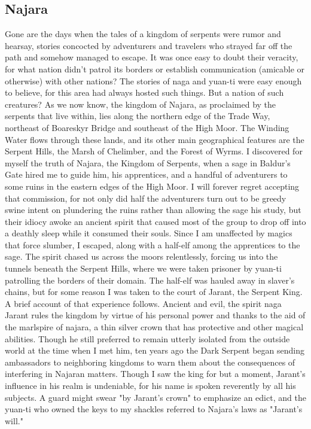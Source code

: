 \documentclass[10pt,a4paper,twoside,twocolumn,openany,bg=print,nodeprecatedcode]{dndbook}
\begin{document}
\subsection{Najara}
Gone are the days when the tales of a kingdom of serpents were rumor and hearsay, stories concocted by adventurers and travelers who strayed far off the path and somehow managed to escape. It was once easy to doubt their veracity, for what nation didn't patrol its borders or establish communication (amicable or otherwise) with other nations? The stories of naga and yuan-ti were easy enough to believe, for this area had always hosted such things. But a nation of such creatures?
As we now know, the kingdom of Najara, as proclaimed by the serpents that live within, lies along the northern edge of the Trade Way, northeast of Boareskyr Bridge and southeast of the High Moor. The Winding Water flows through these lands, and its other main geographical features are the Serpent Hills, the Marsh of Chelimber, and the Forest of Wyrms.
I discovered for myself the truth of Najara, the Kingdom of Serpents, when a sage in Baldur's Gate hired me to guide him, his apprentices, and a handful of adventurers to some ruins in the eastern edges of the High Moor. I will forever regret accepting that commission, for not only did half the adventurers turn out to be greedy swine intent on plundering the ruins rather than allowing the sage his study, but their idiocy awoke an ancient spirit that caused most of the group to drop off into a deathly sleep while it consumed their souls. Since I am unaffected by magics that force slumber, I escaped, along with a half-elf among the apprentices to the sage. The spirit chased us across the moors relentlessly, forcing us into the tunnels beneath the Serpent Hills, where we were taken prisoner by yuan-ti patrolling the borders of their domain. The half-elf was hauled away in slaver's chains, but for some reason I was taken to the court of Jarant, the Serpent King. A brief account of that experience follows.
Ancient and evil, the spirit naga Jarant rules the kingdom by virtue of his personal power and thanks to the aid of the marlspire of najara, a thin silver crown that has protective and other magical abilities. Though he still preferred to remain utterly isolated from the outside world at the time when I met him, ten years ago the Dark Serpent began sending ambassadors to neighboring kingdoms to warn them about the consequences of interfering in Najaran matters. Though I saw the king for but a moment, Jarant's influence in his realm is undeniable, for his name is spoken reverently by all his subjects. A guard might swear "by Jarant's crown" to emphasize an edict, and the yuan-ti who owned the keys to my shackles referred to Najara's laws as "Jarant's will."
\end{document}
